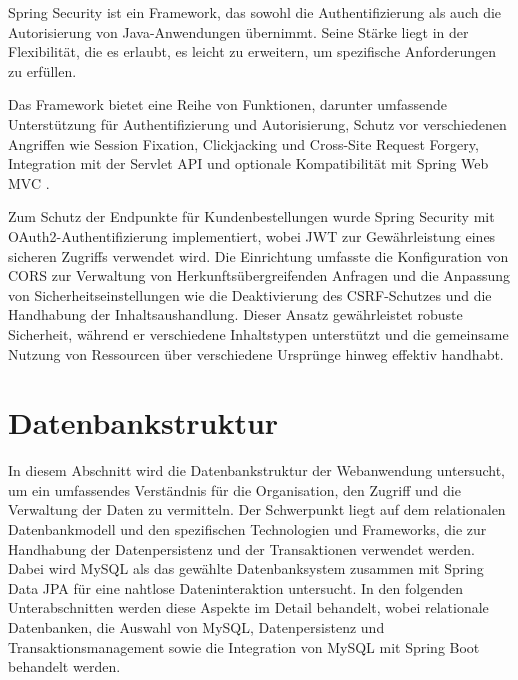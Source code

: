 Spring Security ist ein Framework, das sowohl die Authentifizierung als auch die Autorisierung von Java-Anwendungen übernimmt. Seine Stärke liegt in der Flexibilität, die es erlaubt, es leicht zu erweitern, um spezifische Anforderungen zu erfüllen.

Das Framework bietet eine Reihe von Funktionen, darunter umfassende Unterstützung für Authentifizierung und Autorisierung, Schutz vor verschiedenen Angriffen wie Session Fixation, Clickjacking und Cross-Site Request Forgery, Integration mit der Servlet API und optionale Kompatibilität mit Spring Web MVC \cite{Spring-Security:o.J}.

Zum Schutz der Endpunkte für Kundenbestellungen wurde Spring Security mit OAuth2-Authentifizierung implementiert, wobei JWT zur Gewährleistung eines sicheren Zugriffs verwendet wird. Die Einrichtung umfasste die Konfiguration von CORS zur Verwaltung von Herkunftsübergreifenden Anfragen und die Anpassung von Sicherheitseinstellungen wie die Deaktivierung des CSRF-Schutzes und die Handhabung der Inhaltsaushandlung. Dieser Ansatz gewährleistet robuste Sicherheit, während er verschiedene Inhaltstypen unterstützt und die gemeinsame Nutzung von Ressourcen über verschiedene Ursprünge hinweg effektiv handhabt.


\section{Datenbankstruktur}
In diesem Abschnitt wird die Datenbankstruktur der Webanwendung untersucht, um ein umfassendes Verständnis für die Organisation, den Zugriff und die Verwaltung der Daten zu vermitteln. Der Schwerpunkt liegt auf dem relationalen Datenbankmodell und den spezifischen Technologien und Frameworks, die zur Handhabung der Datenpersistenz und der Transaktionen verwendet werden. Dabei wird MySQL als das gewählte Datenbanksystem zusammen mit Spring Data JPA für eine nahtlose Dateninteraktion untersucht. In den folgenden Unterabschnitten werden diese Aspekte im Detail behandelt, wobei relationale Datenbanken, die Auswahl von MySQL, Datenpersistenz und Transaktionsmanagement sowie die Integration von MySQL mit Spring Boot behandelt werden.
